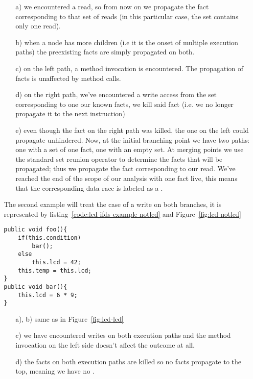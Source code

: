 \begin{enumerate}
  \item [a)] we encountered a read, so from now on we propagate the fact
  corresponding to that set of reads (in this particular case, the set contains
  only one read).
  \item [b)] when a node has more children (i.e it is the onset of multiple
  execution paths) the preexisting facts are simply propagated on both.
  \item [c)] on the left path, a method invocation is encountered. The
  propagation of facts is unaffected by method calls.
  \item [d)] on the right path, we've encountered a write access from the set
  corresponding to one our known facts, we kill said fact (i.e. we no longer
  propagate it to the next instruction)
  \item[e)] even though the fact on the right path was killed, the one on the
  left could propagate unhindered. Now, at the initial branching point we have
  two paths: one with a set of one fact, one with an empty set. At merging
  points we use the standard set reunion operator to determine the facts that
  will be propagated; thus we propagate the fact corresponding to our read.
  We've reached the end of the scope of our analysis with one fact live,
  this means that the corresponding data race is labeled as a \lcd.
\end{enumerate}

The second example will treat the case of a write on both branches, it is
represented by listing~\ref{code:lcd-ifds-example-notlcd} and
Figure~\ref{fig:lcd-notlcd}

\begin{lstlisting}[caption={Code after which the graph in the example of an LCD
is made}, label={code:lcd-ifds-example-notlcd}]
public void foo(){
	if(this.condition)
		bar(); 
	else 
		this.lcd = 42;
	this.temp = this.lcd;
}
public void bar(){
	this.lcd = 6 * 9;
}
\end{lstlisting}
\begin{enumerate}
  \item [a), b)] same as in Figure~\ref{fig:lcd-lcd}
  \item [c)] we have encountered writes on both execution paths and the method
  invocation on the left side doesn't affect the outcome at all.
  \item [d)] the facts on both execution paths are killed so no facts propagate
  to the top, meaning we have no \lcds.
\end{enumerate}

